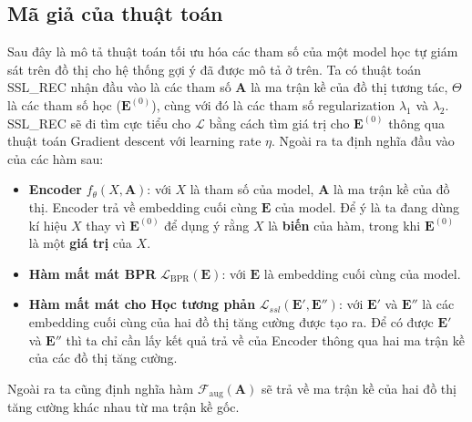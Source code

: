 \subsection{Mã giả của thuật toán}
\noindent Sau đây là mô tả thuật toán tối ưu hóa các tham số của một model học tự giám sát trên đồ thị cho hệ thống gợi ý đã được mô tả ở trên. Ta có thuật toán SSL\_REC nhận đầu vào là các tham số $\mathbf{A}$ là ma trận kề của đồ thị tương tác, $\Theta$ là các tham số học ($\mathbf{E}^{(0)}$), cùng với đó là các tham số regularization $\lambda_1$ và $\lambda_2$. SSL\_REC sẽ đi tìm cực tiểu cho $\mathcal{L}$ bằng cách tìm giá trị cho $\mathbf{E}^{(0)}$ thông qua thuật toán Gradient descent với learning rate $\eta$. Ngoài ra ta định nghĩa đầu vào của các hàm sau:
\begin{itemize}
    \item[] \textbf{Encoder} $f_\theta(X, \mathbf{A})$: với $X$ là tham số của model, $\mathbf{A}$ là ma trận kề của đồ thị. Encoder trả về embedding cuối cùng $\mathbf{E}$ của model. Để ý là ta đang dùng kí hiệu $X$ thay vì $\mathbf{E}^{(0)}$ để dụng ý rằng $X$ là \textbf{biến} của hàm, trong khi $\mathbf{E}^{(0)}$ là một \textbf{giá trị} của $X$.

    \item[] \textbf{Hàm mất mát BPR} $\mathcal{L}_\text{BPR}(\mathbf{E})$: với $\mathbf{E}$ là embedding cuối cùng của model.

    \item[] \textbf{Hàm mất mát cho Học tương phản} $\mathcal{L}_\textit{ssl}(\mathbf{E}', \mathbf{E}'')$: với $\mathbf{E}'$ và $\mathbf{E}''$ là các embedding cuối cùng của hai đồ thị tăng cường được tạo ra. Để có được $\mathbf{E}'$ và $\mathbf{E}''$ thì ta chỉ cần lấy kết quả trả về của Encoder thông qua hai ma trận kề của các đồ thị tăng cường.
\end{itemize}
Ngoài ra ta cũng định nghĩa hàm $\mathcal{F}_\text{aug}(\mathbf{A})$ sẽ trả về ma trận kề của hai đồ thị tăng cường khác nhau từ ma trận kề gốc.

